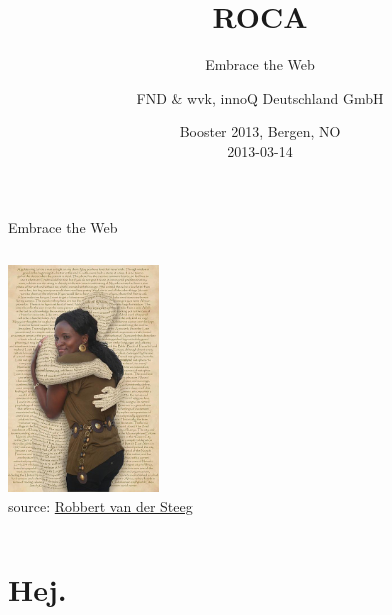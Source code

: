 \documentclass{beamer}
\date{Booster 2013, Bergen, NO \\ 2013-03-14}
\author{FND \& wvk, innoQ Deutschland GmbH}
\title{ROCA}
\subtitle{Embrace the Web}
\begin{document}
  {

  \begin{frame}[plain]
    \titlepage
  \end{frame}
}

\setcounter{tocdepth}{1}

\begin{frame}{Embrace the Web}
  \begin{columns}
    \begin{column}{4.4cm}
      \includegraphics[width=4cm]{images/embrace.jpg}
      \\
      \tiny source: \href{http://www.flickr.com/photos/robbie73/4289385819/}{Robbert van der Steeg}
    \end{column}

    \begin{column}{6.6cm}
      \tableofcontents
    \end{column}
  \end{columns}
\end{frame}

\section{Hej.}
\end{document}
